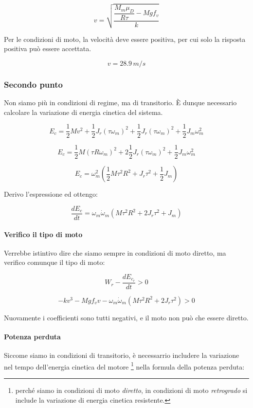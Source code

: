 \documentclass[main.tex]{subfiles}
\begin{document}
\begin{equation}
   v  = \sqrt{\dfrac{\dfrac{M_m\mu_D}{R\tau} - Mgf_v}{k}}
\end{equation}

Per le condizioni di moto, la velocità deve essere positiva, per cui solo la risposta positiva può essere accettata.

\begin{equation}
  v = 28.9\,m/s
\end{equation}

\subsubsection{Secondo punto}
Non siamo più in condizioni di regime, ma di transitorio. È dunque necessario calcolare la variazione di energia cinetica del sistema.

\[
  E_c = \dfrac{1}{2}Mv^2 + \dfrac{1}{2}J_r(\tau\omega_m)^2 + \dfrac{1}{2}J_r(\tau\omega_m)^2 + \dfrac{1}{2}J_m\omega_m^2
\]

\[
  E_c = \dfrac{1}{2}M(\tau R\omega_m)^2 + 2\dfrac{1}{2}J_r(\tau\omega_m)^2 + \dfrac{1}{2}J_m\omega_m^2
\]

\[
  E_c = \omega_m^2(\dfrac{1}{2}M\tau^2R^2 + J_r\tau^2 + \dfrac{1}{2}J_m)
\]

Derivo l'espressione ed ottengo:

\[
  \dfrac{dE_c}{dt} = \omega_m\dot{\omega}_m(M\tau^2R^2 + 2J_r\tau^2 + J_m)
\]

\paragraph{Verifico il tipo di moto}
Verrebbe istintivo dire che siamo sempre in condizioni di moto diretto, ma verifico comunque il tipo di moto:

\[
  W_r - \dfrac{dE_{c_r}}{dt} > 0
\]

\[
  -kv^3 - Mgf_vv -\omega_m\dot{\omega}_m(M\tau^2R^2 + 2J_r\tau^2) > 0
\]

Nuovamente i coefficienti sono tutti negativi, e il moto non può che essere diretto.

\paragraph{Potenza perduta}
Siccome siamo in condizioni di transitorio, è necessarrio includere la variazione nel tempo dell'energia cinetica del motore \footnote{perché siamo in condizioni di moto \textit{diretto}, in condizioni di moto \textit{retrogrado} si include la variazione di energia cinetica resistente.} nella formula della potenza perduta:
\end{document}
